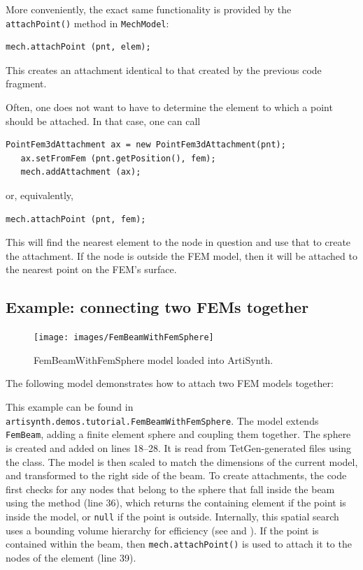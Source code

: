 More conveniently, the exact same functionality is provided
by the {\tt attachPoint()} method in {\tt MechModel}:
%
\begin{lstlisting}[]
   mech.attachPoint (pnt, elem);
\end{lstlisting}
%
This creates an attachment identical to that created by the previous
code fragment.

Often, one does not want to have to determine the element 
to which a point should be attached. In that case, one can call
%
\begin{lstlisting}[]
   PointFem3dAttachment ax = new PointFem3dAttachment(pnt);
   ax.setFromFem (pnt.getPosition(), fem);
   mech.addAttachment (ax);
\end{lstlisting}
%
or, equivalently, 
%
\begin{lstlisting}[]
   mech.attachPoint (pnt, fem);
\end{lstlisting}
%
This will find the nearest element to the node in question and use
that to create the attachment. If the node is outside the FEM model,
then it will be attached to the nearest point on the FEM's surface.

\subsection{Example: connecting two FEMs together}
\label{connectingTwoFems:sec}

\begin{figure}[ht]
	\centering
	\texttt{[image: images/FemBeamWithFemSphere]}
	\caption{FemBeamWithFemSphere model loaded into ArtiSynth.}
	\label{fig:fem:beamwithfemsphere}
\end{figure}

The following model demonstrates how to attach two FEM models together:
\lstset{numbers=left}

\lstset{numbers=none}
This example can be found in 
{\tt artisynth.demos.tutorial.FemBeamWithFemSphere}.  The model extends 
{\tt FemBeam}, adding a finite element sphere and coupling them together.
The sphere is created and added on lines 18--28.  It is read from
TetGen-generated files using the 
 class.  The model is then
scaled to match the dimensions of the current model, and transformed to the
right side of the beam.  To create attachments, the code first checks for 
any nodes that belong to the sphere that fall inside the beam using the
method (line 36), which returns the containing element if the point is inside
the model, or {\tt null} if the point is outside.  Internally, this spatial 
search uses a bounding volume hierarchy for efficiency (see 
 and 
).  If the point is contained
within the beam, then {\tt mech.attachPoint()}
is used to attach it to the nodes of the element (line 39).

